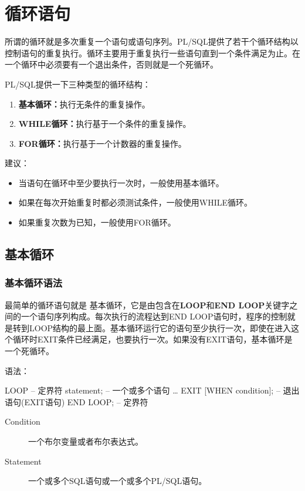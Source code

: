 \documentclass[11pt, a4paper, oneside, UTF8]{ctexbook}
\let\kaishu\relax %
\begin{document}
\chapter{循环语句}
所谓的循环就是多次重复一个语句或语句序列。PL/SQL提供了若干个循环结构以控制语句的重复执行。循环主要用于重复执行一些语句直到一个条件满足为止。在一个循环中必须要有一个退出条件，否则就是一个死循环。

PL/SQL提供一下三种类型的循环结构：
\begin{enumerate}
  \item {\bfseries\kaishu 基本循环：}执行无条件的重复操作。
  \item {\bfseries\kaishu WHILE循环：}执行基于一个条件的重复操作。
  \item {\bfseries\kaishu FOR循环：}执行基于一个计数器的重复操作。
\end{enumerate}

建议：
\begin{itemize}
  \item 当语句在循环中至少要执行一次时，一般使用基本循环。
  \item 如果在每次开始重复时都必须测试条件，一般使用WHILE循环。
  \item 如果重复次数为已知，一般使用FOR循环。
\end{itemize}

\section{基本循环}
\subsection{基本循环语法}
最简单的循环语句就是
基本循环，它是由包含在\textbf{LOOP}和\textbf{END LOOP}关键字之间的一个语句序列构成。每次执行的流程达到END LOOP语句时，程序的控制就是转到LOOP结构的最上面。基本循环运行它的语句至少执行一次，即使在进入这个循环时EXIT条件已经满足，也要执行一次。如果没有EXIT语句，基本循环是一个死循环。

语法：
\begin{plsql}[caption=基本循环语法]
LOOP -- 定界符
  statement; -- 一个或多个语句
  …
  EXIT [WHEN condition]; -- 退出语句(EXIT语句)
END LOOP; -- 定界符
\end{plsql}

\begin{description}
  \item[Condition] 一个布尔变量或者布尔表达式。
  \item[Statement] 一个或多个SQL语句或一个或多个PL/SQL语句。
\end{description}
\end{document}
